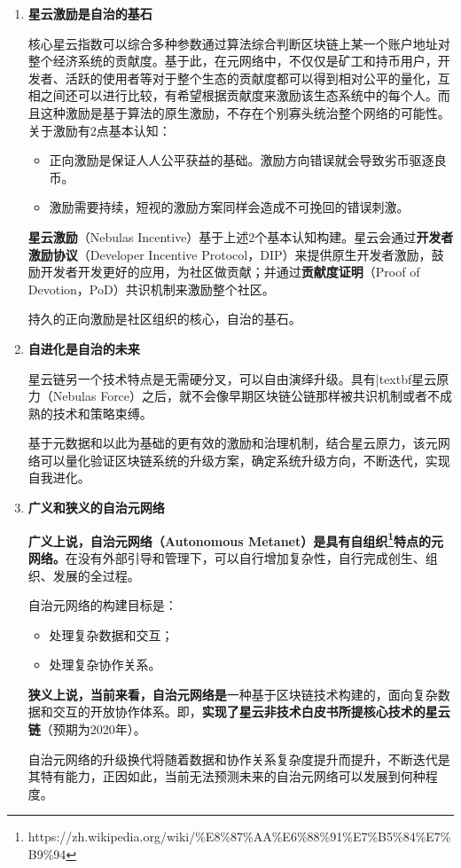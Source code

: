 \begin{enumerate}
	\item \textbf{星云激励是自治的基石}
	
	核心星云指数可以综合多种参数通过算法综合判断区块链上某一个账户地址对整个经济系统的贡献度。基于此，在元网络中，不仅仅是矿工和持币用户，开发者、活跃的使用者等对于整个生态的贡献度都可以得到相对公平的量化，互相之间还可以进行比较，有希望根据贡献度来激励该生态系统中的每个人。而且这种激励是基于算法的原生激励，不存在个别寡头统治整个网络的可能性。
	关于激励有2点基本认知：
	\begin{itemize}
		\item 正向激励是保证人人公平获益的基础。激励方向错误就会导致劣币驱逐良币。
		\item 激励需要持续，短视的激励方案同样会造成不可挽回的错误刺激。
	\end{itemize}
	\textbf{星云激励}（Nebulas Incentive）基于上述2个基本认知构建。星云会通过\textbf{开发者激励协议}（Developer Incentive Protocol，DIP）来提供原生开发者激励，鼓励开发者开发更好的应用，为社区做贡献；并通过\textbf{贡献度证明}（Proof of Devotion，PoD）共识机制来激励整个社区。
	
	持久的正向激励是社区组织的核心，自治的基石。
	
	\item \textbf{自进化是自治的未来}
	
	星云链另一个技术特点是无需硬分叉，可以自由演绎升级。具有|textbf{星云原力}（Nebulas Force）之后，就不会像早期区块链公链那样被共识机制或者不成熟的技术和策略束缚。
	
	基于元数据和以此为基础的更有效的激励和治理机制，结合星云原力，该元网络可以量化验证区块链系统的升级方案，确定系统升级方向，不断迭代，实现自我进化。
	
	\item \textbf{广义和狭义的自治元网络}
	
	\textbf{广义上说，自治元网络（Autonomous Metanet）是具有自组织\footnote{https://zh.wikipedia.org/wiki/\%E8\%87\%AA\%E6\%88\%91\%E7\%B5\%84\%E7\%B9\%94}特点的元网络。}在没有外部引导和管理下，可以自行增加复杂性，自行完成创生、组织、发展的全过程。
	
	自治元网络的构建目标是：
	\begin{itemize}
		\item 处理复杂数据和交互；
	    \item 处理复杂协作关系。
	\end{itemize}
	\textbf{狭义上说，当前来看，自治元网络是}一种基于区块链技术构建的，面向复杂数据和交互的开放协作体系。即，\textbf{实现了星云非技术白皮书所提核心技术的星云链}（预期为2020年）。
	
	自治元网络的升级换代将随着数据和协作关系复杂度提升而提升，不断迭代是其特有能力，正因如此，当前无法预测未来的自治元网络可以发展到何种程度。
\end{enumerate}


